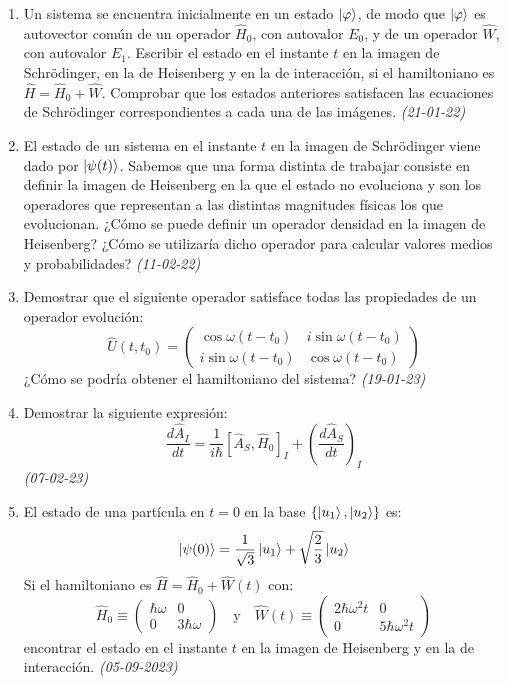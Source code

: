 \begin{enumerate}
    \item Un sistema se encuentra inicialmente en un estado $\ket{\varphi}$, de modo que $\ket{\varphi}$ es autovector común de un operador $\hat{H}_0$, con autovalor $E_0$, y de un operador $\hat{W}$, con autovalor $E_1$. Escribir el estado en el instante $t$ en la imagen de Schrödinger, en la de Heisenberg y en la de interacción, si el hamiltoniano es $\hat{H} = \hat{H}_0 + \hat{W}$. Comprobar que los estados anteriores satisfacen las ecuaciones de Schrödinger correspondientes a cada una de las imágenes. \textit{(21-01-22)}
    
    \item El estado de un sistema en el instante $t$ en la imagen de Schrödinger viene dado por $\ket{\psi(t)}$. Sabemos que una forma distinta de trabajar consiste en definir la imagen de Heisenberg en la que el estado no evoluciona y son los operadores que representan a las distintas magnitudes físicas los que evolucionan. ¿Cómo se puede definir un operador densidad en la imagen de Heisenberg? ¿Cómo se utilizaría dicho operador para calcular valores medios y probabilidades? \textit{(11-02-22)}
    
    \item Demostrar que el siguiente operador satisface todas las propiedades de un operador evolución:
    \[
    \hat{U}(t, t_0) = \begin{pmatrix} \cos \omega (t - t_0) & i \sin \omega (t - t_0) \\ i \sin \omega (t - t_0) & \cos \omega (t - t_0) \end{pmatrix}
    \]
    ¿Cómo se podría obtener el hamiltoniano del sistema? \textit{(19-01-23)}

    \item Demostrar la siguiente expresión:
    \[
    \frac{d\hat{A}_I}{dt} = \frac{1}{i\hbar} \left[ \hat{A}_S, \hat{H}_0 \right]_I + \left( \frac{d\hat{A}_S}{dt} \right)_I
    \] \textit{(07-02-23)}

    \item El estado de una partícula en $t = 0$ en la base $\{\ket{u_1}, \ket{u_2}\}$ es:
    \[
    \ket{\psi(0)} = \frac{1}{\sqrt{3}} \ket{u_1} + \sqrt{\frac{2}{3}} \ket{u_2}
    \]
    Si el hamiltoniano es $\hat{H} = \hat{H}_0 + \hat{W}(t)$ con:
    \[
    \hat{H}_0 \equiv \begin{pmatrix} \hbar \omega & 0 \\ 0 & 3\hbar \omega \end{pmatrix} \quad \text{y} \quad \hat{W}(t) \equiv \begin{pmatrix} 2\hbar \omega^2 t & 0 \\ 0 & 5\hbar \omega^2 t \end{pmatrix}
    \]
    encontrar el estado en el instante $t$ en la imagen de Heisenberg y en la de interacción. \textit{(05-09-2023)}


\end{enumerate}

